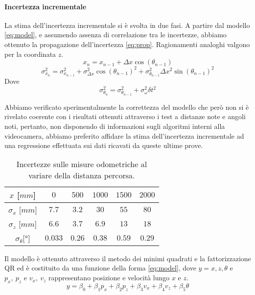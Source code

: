 \documentclass[
	a4paper, %
	10pt, %
]{LTJournalArticle}
\begin{document}
\paragraph{Incertezza incrementale} La stima dell'incertezza incrementale si è svolta in due fasi. A partire dal modello \ref{eq:model}, e assumendo assenza di correlazione tra le incertezze, abbiamo ottenuto la propagazione dell'incertezza \ref{eq:prop}. Ragionamenti analoghi valgono per la coordinata $z$.
\vspace{-4pt}
\begin{equation}
        x_n =x_{n-1}+\Delta x  \cos{(\theta_{n-1})}
    \label{eq:model}
\end{equation}
\vspace{-10pt}
\vspace{-4pt}
\begin{equation}
        \sigma_{x_n}^2 = \sigma_{x_{n-1}}^2 + \sigma_{\Delta x}^2 \cos{(\theta_{n-1})}^2 + \sigma_{\theta_{n-1}}^2 \Delta x ^2 \sin{(\theta_{n-1})}^2
        \label{eq:prop}
\end{equation}
Dove
\begin{equation}
    \sigma_{\theta_{n}}^2 = \sigma_{\theta_{n-1}}^2 + \sigma_{\omega}^2 \delta t^2
    \label{eq:angleprop}
\end{equation}

Abbiamo verificato sperimentalmente la correttezza del modello che però non si è rivelato coerente con i risultati ottenuti attraverso i test a distanze note e angoli noti, pertanto, non disponendo di informazioni sugli algoritmi interni alla videocamera, abbiamo preferito affidare la stima dell'incertezza incrementale ad una regressione effettuata sui dati ricavati da queste ultime prove.

\begin{table}[h]
    \centering
    \begin{tabular}{|c|c|c|c|c|c|}
    \hline
       $x$ [$mm$]          & $0$ & $500$ & $1000$ & $1500$ & $2000$\\
    \hline
        $\sigma_x$ [$mm$]&  $7.7$ & $3.2$ & $30$ & $55$ & $80$\\
        $\sigma_z$ [$mm$]&  $6.6$ & $3.7$ & $6.9$ & $13$ & $18$\\
        $\sigma_{\theta} [$°$]$ & $0.033$ & $0.26$ & $0.38$ & $0.59$ & $0.29$\\
    \hline
    \end{tabular}
    \caption{Incertezze sulle misure odometriche al variare della distanza percorsa.}
    \label{tab:uncertainties}
\end{table}
\vspace{-10pt}
Il modello è ottenuto attraverso il metodo dei minimi quadrati e la fattorizzazione QR ed è costituito da una funzione della forma \ref{eq:model}, dove $y = {x,z,\theta}$ e $p_x,\ p_z$ e $v_x,\ v_z$ rappresentano posizione e velocità lungo $x$ e $z$.
\vspace{-10pt}
\begin{equation}
    y = \beta_0 + \beta_{1}p_{x} + \beta_{2}p_{z} + \beta_{3}v_{x} + \beta_{4}v_{z} + \beta_{5}\theta
    \label{eq:model}
\end{equation}
\end{document}
